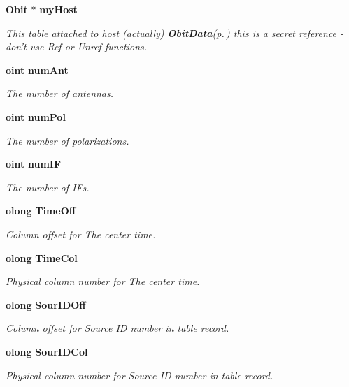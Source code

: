 \begin{CompactItemize}
{\bf Obit} $\ast$ {\bf my\-Host}
\begin{CompactList}\small\item\em This table attached to host (actually) {\bf Obit\-Data}{\rm (p.\,\pageref{structObitData})} this is a secret reference - don't use Ref or Unref functions. \item\end{CompactList}\item 
{\bf oint} {\bf num\-Ant}
\begin{CompactList}\small\item\em The number of antennas. \item\end{CompactList}\item 
{\bf oint} {\bf num\-Pol}
\begin{CompactList}\small\item\em The number of polarizations. \item\end{CompactList}\item 
{\bf oint} {\bf num\-IF}
\begin{CompactList}\small\item\em The number of IFs. \item\end{CompactList}\item 
{\bf olong} {\bf Time\-Off}
\begin{CompactList}\small\item\em Column offset for The center time. \item\end{CompactList}\item 
{\bf olong} {\bf Time\-Col}
\begin{CompactList}\small\item\em Physical column number for The center time. \item\end{CompactList}\item 
{\bf olong} {\bf Sour\-IDOff}
\begin{CompactList}\small\item\em Column offset for Source ID number in table record. \item\end{CompactList}\item 
{\bf olong} {\bf Sour\-IDCol}
\begin{CompactList}\small\item\em Physical column number for Source ID number in table record. \item\end{CompactList}\item 

\end{CompactItemize}
